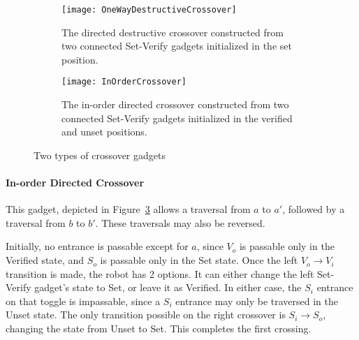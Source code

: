 \begin{figure}[!ht]
  \centering
  \begin{subfigure}[b]{0.47\textwidth}
    \texttt{[image: OneWayDestructiveCrossover]}
    \caption{The directed destructive crossover constructed from two connected Set-Verify gadgets initialized in the set position.}
    \label{fig:DestructiveCrossover}
  \end{subfigure}
  \hfill
  \begin{subfigure}[b]{0.47\textwidth}
    \texttt{[image: InOrderCrossover]}
    \caption{The in-order directed crossover constructed from two connected Set-Verify gadgets initialized in the verified and unset positions.}
    \label{fig:InOrderCrossover}
  \end{subfigure}
  \caption{Two types of crossover gadgets}
\end{figure}




\paragraph{In-order Directed Crossover} This gadget, depicted in Figure~\ref{fig:InOrderCrossover} allows a traversal from $a$ to $a'$, followed by a traversal from $b$ to $b'$. These traversals may also be reversed.

Initially, no entrance is passable except for $a$, since $V_o$ is passable only in the Verified state, and $S_o$ is
passable only in the Set state. Once the left $V_o \rightarrow V_i$ transition is made, the robot has 2 options.
It can either change the left Set-Verify gadget's state to Set, or leave it as Verified. In either case, the $S_i$
entrance on that toggle is impassable, since a $S_i$ entrance may only be traversed in the Unset state. The
only transition possible on the right crossover is $S_i \rightarrow S_o$, changing the state from Unset to Set.
This completes the first crossing.

